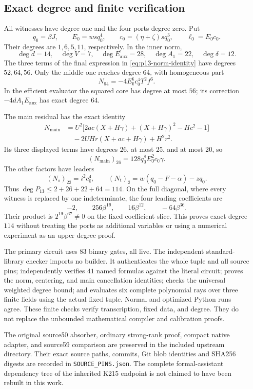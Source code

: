 \subsection{Exact degree and finite verification}

All witnesses have degree one and the four ports degree zero. Put
\[
 q_0=\beta J,\qquad E_0=wsq_0^4,\qquad
 c_0=(\eta+\zeta)sq_0^3,\qquad \ell_0=E_0c_0.
\]
Their degrees are $1,6,5,11$, respectively. In the inner norm,
\[
 \deg d=14,\quad \deg V=7,\quad\deg E_{\mathrm{aux}}=28,
 \quad\deg A_1=22,\quad\deg\delta=12.
\]
The three terms of the final expression in
\eqref{eq:p13-norm-identity} have degrees $52,64,56$.
Only the middle one reaches degree $64$, with homogeneous part
\begin{equation}
 N_{64}=-4E_0^6c_0^4T^2f^6.
 \label{eq:p13-inner-head}
\end{equation}
In the efficient evaluator the squared core has degree at most $56$;
its correction $-4dA_1E_{\mathrm{aux}}$ has exact degree $64$.

The main residual has the exact identity
\begin{align*}
 N_{\mathrm{main}}
 &=U^2\bigl[2ac(X+H\gamma)+(X+H\gamma)^2-Hc^2-1\bigr]\\
 &\quad-2UHr(X+ac+H\gamma)+H^2r^2.
\end{align*}
Its three displayed terms have degrees $26$, at most $25$, and at most
$20$, so
\[
 (N_{\mathrm{main}})_{26}=128q_0^8E_0^2c_0\gamma.
\]
The other factors have leaders
\[
 (N_s)_{22}=i^2c_0^4,\qquad
 (N_t)_2=w(q_0-F-\alpha)-zq_0.
\]
Thus $\deg P_{13}\le2+26+22+64=114$.
On the full diagonal, where every witness is replaced by one
indeterminate, the four leading coefficients are
\[
 -2,\qquad 256\beta^{19},\qquad16\beta^{12},\qquad-64\beta^{36}.
\]
Their product is $2^{19}\beta^{67}\ne0$ on the fixed coefficient slice.
This proves exact degree $114$ without treating the ports as additional
variables or using a numerical experiment as an upper-degree proof.

The primary circuit uses $83$ binary gates, all live. The independent
standard-library checker imports no builder. It authenticates the whole
tuple and all source pins; independently verifies $41$ named formulas
against the literal circuit; proves the norm, centering, and main
cancellation identities; checks the universal weighted degree bound;
and evaluates six complete polynomial rays over three finite fields
using the actual fixed tuple. Normal and optimized Python runs agree.
These finite checks verify transcription, fixed data, and degree. They do
not replace the unbounded mathematical compiler and calibration proofs.

The original source50 absorber, ordinary strong-rank proof, compact native
adapter, and source59 comparison are preserved in the included upstream
directory. Their exact source paths, commits, Git blob identities and
SHA256 digests are recorded in \texttt{SOURCE\_PINS.json}. The complete
formal-assistant dependency tree of the inherited K215 endpoint is not
claimed to have been rebuilt in this work.
